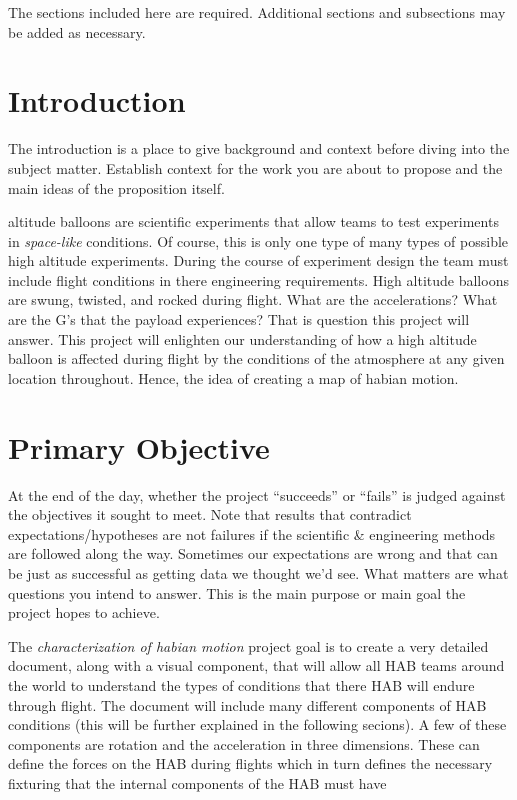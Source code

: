 \documentclass[journal]{SPEXformat}
\newenvironment{help}{
  \ttfamily\footnotesize\sloppy
  \begin{lrbox}{\helpbox}\begin{minipage}{\linewidth}
  }{
  \end{minipage}\end{lrbox}
  \ifbool{showhelp}{
    \fbox{\usebox{\helpbox}}
  }{}
}
\begin{document}
\printnomenclature{}
\begin{help}
  The sections included here are required. Additional sections and subsections may be added as necessary.
\end{help}
\section{Introduction}
\label{sec:introduction}
\begin{help}
  The introduction is a place to give background and context before diving into the subject matter.
  Establish context for the work you are about to propose and the main ideas of the proposition itself.
\end{help}
 altitude balloons are scientific experiments that allow teams to test experiments in \textit{space-like} conditions.
  Of course, this is only one type of many types of possible high altitude experiments. During the course of experiment
  design the team must include flight conditions in there engineering requirements. High altitude balloons are swung,
  twisted, and rocked during flight. What are the accelerations? What are the G's that the payload experiences?
  That is question this project will answer. This project will enlighten our understanding of how a high altitude balloon
  is affected during flight by the conditions of the atmosphere at any given location throughout. Hence, the idea
  of creating a map of habian motion.

\section{Primary Objective}
\label{sec:primary-obj}
\begin{help}
  At the end of the day, whether the project ``succeeds'' or ``fails'' is judged against the objectives it sought to meet.
  Note that results that contradict expectations/hypotheses are not failures if the scientific \& engineering methods are followed along the way.
  Sometimes our expectations are wrong and that can be just as successful as getting data we thought we'd see.
  What matters are what questions you intend to answer.
  This is the main purpose or main goal the project hopes to achieve.
\end{help}
  The \textit{characterization of habian motion} project goal is to create a very detailed document, along with a
  visual component, that will allow all HAB teams around the world to understand the types of conditions that
  there HAB will endure through flight. The document will include many different components of HAB conditions (this will be
  further explained in the following secions). A few of these components are rotation and the acceleration in
  three dimensions. These can define the forces on the HAB during flights which in turn defines the necessary fixturing
  that the internal components of the HAB must have
\end{document}
